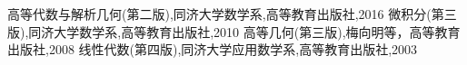 \begin{thebibliography}{99}
 高等代数与解析几何(第二版),同济大学数学系,高等教育出版社,2016
 微积分(第三版),同济大学数学系,高等教育出版社,2010
 高等几何(第三版),梅向明等，高等教育出版社,2008
 线性代数(第四版),同济大学应用数学系,高等教育出版社,2003
\end{thebibliography}
